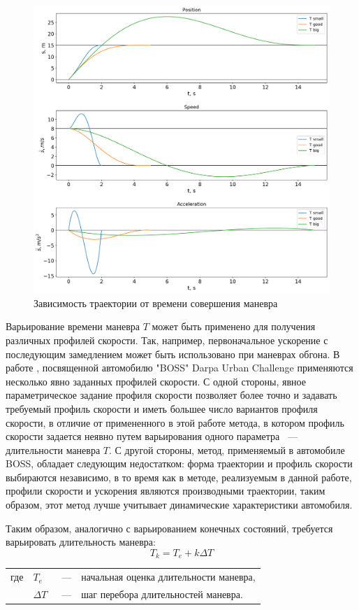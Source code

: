 \begin{figure}[h]
      \centering
      \includegraphics[width=\linewidth]{images/quintic_bad_t}
      \caption{Зависимость траектории от времени совершения маневра}
      \label{img:quintic_bad_t}
\end{figure}

Варьирование времени маневра $T$ может быть применено для получения различных профилей скорости. Так, например,
первоначальное ускорение с последующим замедлением может быть использовано при маневрах обгона.
В работе \cite{darpa_boss}, посвященной автомобилю "BOSS" Darpa Urban Challenge применяются несколько явно заданных
профилей скорости. С одной стороны, явное параметрическое задание профиля скорости позволяет более точно и задавать
требуемый профиль скорости и иметь большее число вариантов профиля скорости, в отличие от примененного в этой работе
метода, в котором профиль скорости задается неявно путем варьирования одного параметра ~--- длительности маневра $T$.
С другой стороны, метод, применяемый в автомобиле BOSS, обладает следующим недостатком: форма траектории и профиль
скорости выбираются независимо, в то время как в методе, реализуемым  в данной работе, профили скорости и ускорения
являются производными траектории, таким образом, этот метод лучше учитывает динамические характеристики автомобиля.

Таким образом, аналогично с варьированием конечных состояний, требуется варьировать длительность маневра:
\begin{equation}
      T_k = T_e + k\Delta T
\end{equation}
\noindent\begin{tabularx}{\linewidth}{lllX}
      где & $T_e$      &~---& начальная оценка длительности маневра, \\
          & $\Delta T$ &~---& шаг перебора длительностей маневра.
\end{tabularx}

